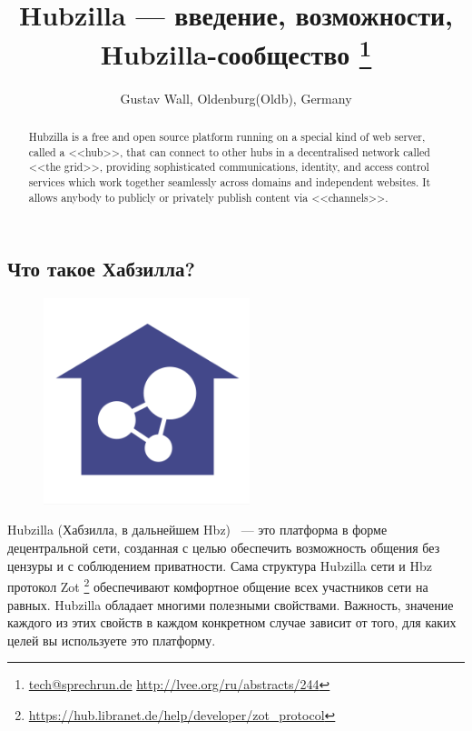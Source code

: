 \documentclass[10pt, a5paper]{article}
\begin{document}
\title{Hubzilla --- введение, возможности, Hubzilla-сообщество \footnote{\url{tech@sprechrun.de} \url{http://lvee.org/ru/abstracts/244}}}
\author{Gustav Wall, Oldenburg(Oldb), Germany}
\maketitle
\begin{abstract}
Hubzilla is a free and open source platform running on a special kind of web server, called a <<hub>>, that can connect to other hubs in a decentralised network called <<the grid>>, providing sophisticated communications, identity, and access control services which work together seamlessly across domains and independent websites. It allows anybody to publicly or privately publish content via <<channels>>.
\end{abstract}
\subsection*{Что такое Хабзилла?}

\begin{center}
\begin{figure}[h!]
  \centering
  \includegraphics[width=6cm]{Wall1.png}
  
  \label{Wall_1}
\end{figure}
\end{center}

Hubzilla (Хабзилла, в дальнейшем Hbz) ~--- это платформа в форме децентральной сети, созданная с целью обеспечить возможность общения без цензуры и с соблюдением приватности. Сама структура Hubzilla сети и Hbz протокол Zot \footnote{\url{https://hub.libranet.de/help/developer/zot_protocol}} обеспечивают комфортное общение всех участников сети на равных. Hubzilla обладает многими полезными свойствами. Важность, значение каждого из этих свойств в каждом конкретном случае зависит от того, для каких целей вы используете это платформу.
\end{document}
